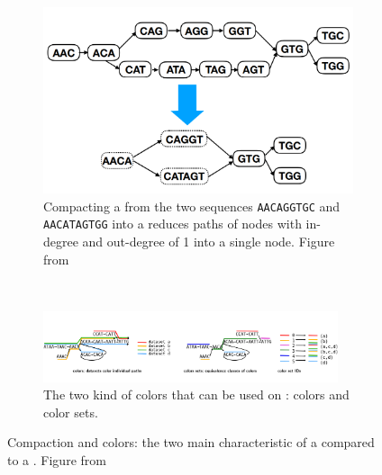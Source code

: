 \begin{figure}[h!]
	\centering
	\begin{subfigure}[b]{0.95\textwidth}
		\centering
		\includegraphics[width=.75\linewidth]{figures/background/compacting.png}
		\caption[Compacting a \dbg.]{Compacting a \dbg from the two sequences \texttt{AACAGGTGC} and \texttt{AACATAGTGG} into a \cdbg reduces paths of nodes with in-degree and out-degree of 1 into a single node. Figure from~\cite{embedding_dbg}}
	\end{subfigure}%
	\\
	\begin{subfigure}[b]{0.95\textwidth}
		\centering
		\includegraphics[width=0.95\textwidth]{figures/background/colors_dbg.png}
		\caption[The colors in a \ccdbg.]{The two kind of colors that can be used on \ccdbg: colors and color sets.} 
	\end{subfigure}
	\caption[Compaction and colors in a \ccdbg.]{Compaction and colors: the two main characteristic of a \ccdbg compared to a \dbg. Figure from~\cite{marchet_kmersets}}
	\label{fig:ccdbg}
\end{figure}
